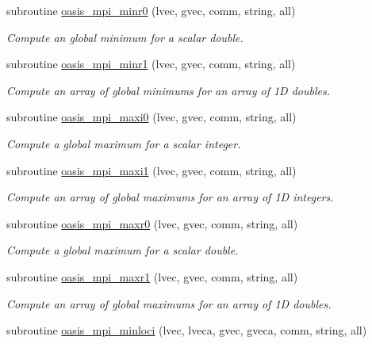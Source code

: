 \begin{DoxyCompactItemize}
subroutine \hyperlink{namespacemod__oasis__mpi_af3628ad005b1a21e8f33e3dc2be38635}{oasis\+\_\+mpi\+\_\+minr0} (lvec, gvec, comm, string, all)
\begin{DoxyCompactList}\small\item\em Compute an global minimum for a scalar double. \end{DoxyCompactList}\item 
subroutine \hyperlink{namespacemod__oasis__mpi_a29c460b836ae9ad77ee1ac21f684d188}{oasis\+\_\+mpi\+\_\+minr1} (lvec, gvec, comm, string, all)
\begin{DoxyCompactList}\small\item\em Compute an array of global minimums for an array of 1D doubles. \end{DoxyCompactList}\item 
subroutine \hyperlink{namespacemod__oasis__mpi_a0b469347d40c78c317042fa069d9baa5}{oasis\+\_\+mpi\+\_\+maxi0} (lvec, gvec, comm, string, all)
\begin{DoxyCompactList}\small\item\em Compute a global maximum for a scalar integer. \end{DoxyCompactList}\item 
subroutine \hyperlink{namespacemod__oasis__mpi_a2ba8d76b016ddde4013aecc2ca0b1d9f}{oasis\+\_\+mpi\+\_\+maxi1} (lvec, gvec, comm, string, all)
\begin{DoxyCompactList}\small\item\em Compute an array of global maximums for an array of 1D integers. \end{DoxyCompactList}\item 
subroutine \hyperlink{namespacemod__oasis__mpi_a7f46e23956ff948e039c5c1cdde0f6f3}{oasis\+\_\+mpi\+\_\+maxr0} (lvec, gvec, comm, string, all)
\begin{DoxyCompactList}\small\item\em Compute a global maximum for a scalar double. \end{DoxyCompactList}\item 
subroutine \hyperlink{namespacemod__oasis__mpi_ae57151fc4714e33d7e0e1cf0aa65ae64}{oasis\+\_\+mpi\+\_\+maxr1} (lvec, gvec, comm, string, all)
\begin{DoxyCompactList}\small\item\em Compute an array of global maximums for an array of 1D doubles. \end{DoxyCompactList}\item 
subroutine \hyperlink{namespacemod__oasis__mpi_a355bbf47408d38b356455c2368ec0f1b}{oasis\+\_\+mpi\+\_\+minloci} (lvec, lveca, gvec, gveca, comm, string, all)

\end{DoxyCompactItemize}
